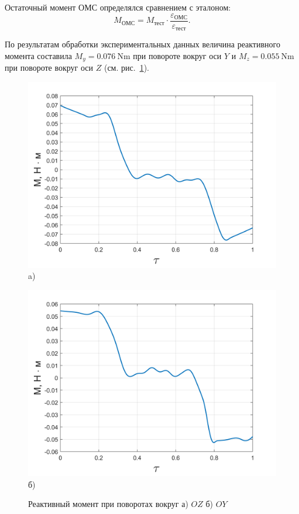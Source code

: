 Остаточный момент ОМС определялся сравнением с эталоном:
\[
M_{\text{ОМС}} = M_{\text{тест}}\cdot\frac{\varepsilon_{\text{ОМС}}}{\varepsilon_{\text{тест}}}\!.
\]

По результатам обработки экспериментальных данных величина реактивного момента составила $M_y = \SI{0,076}{\newton\meter}$ при повороте вокруг оси $Y$ и $M_z = \SI{0,055}{\newton\meter}$ при повороте вокруг оси $Z$ (см. рис.~\cref{fig:omn-mom}).

\begin{figure}[!h]
	\begin{minipage}[b]{0.49\linewidth}\centering
		\includegraphics[width=0.85\linewidth]{matlab/img/oy-gyro-mom.png}\\[-2pt] a)
	\end{minipage}
	\hfill
	\begin{minipage}[b]{0.49\linewidth}\centering
		\includegraphics[width=0.85\linewidth]{matlab/img/oz-gyro-mom.png}\\[-2pt] б)
	\end{minipage}
	\caption{Реактивный момент при поворотах вокруг а) $OZ$ б) $OY$}
	\label{fig:omn-mom}
\end{figure}

